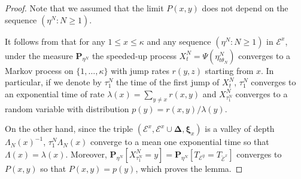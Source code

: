 \documentclass[reqno]{amsart}
\begin{document}
\begin{proof}
Note that we assumed that the limit $P(x,y)$ does not depend on the
sequence $(\eta^N : N\ge 1)$.

It follows from \cite[Theorem 2.7]{bl2} that for any $1\le x\le
\kappa$ and any sequence $(\eta^N : N\ge 1)$ in ${{\mathscr E}}^x$, under the
measure ${{\mathbf P}}_{\eta^N}$ the speeded-up process $X^N_t =
\Psi(\eta^N_{t\theta_N})$ converges to a Markov process on $\{1,
\dots, \kappa\}$ with jump rates $r(y,z)$ starting from $x$. In
particular, if we denote by $\tau^N_1$ the time of the first jump of
$X^N_t$, $\tau^N_1$ converges to an exponential time of rate $\lambda
(x) = \sum_{y\not =x} r(x,y)$ and $X^N_{\tau^N_1}$ converges to a
random variable with distribution $p(y)= r(x,y)/\lambda(y)$.

On the other hand, since the triple $({{\mathscr E}}^x, {{\mathscr E}}^x \cup {{\boldsymbol \Delta}}, {{\boldsymbol \xi}}_x)$ is a valley of depth $\Lambda_N(x)^{-1}$,
$\tau^N_1\Lambda_N(x)$ converge to a mean one exponential time so that
$\Lambda(x) = \lambda(x)$. Moreover, ${{\mathbf P}}_{\eta^N} [X^N_{\tau^N_1} =
y] = {{\mathbf P}}_{\eta^N} [ T_{{{\mathscr E}}^{y}} = T_{\breve{{{\mathscr E}}}^{x}} ]$
converges to $P(x,y)$ so that $P(x,y)=p(y)$, which proves the lemma.
\end{proof}
\end{document}
